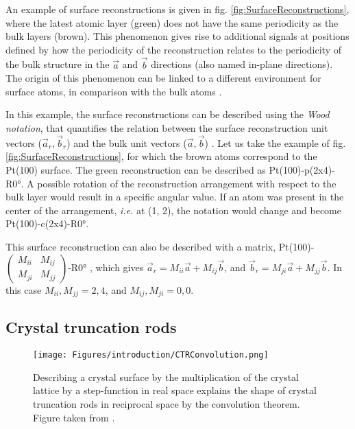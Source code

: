 An example of surface reconstructions is given in fig. \ref{fig:SurfaceReconstructions}, where the latest atomic layer (green) does not have the same periodicity as the bulk layers (brown).
This phenomenon gives rise to additional signals at positions defined by how the periodicity of the reconstruction relates to the periodicity of the bulk structure in the $\vec{a}$ and $\vec{b}$ directions (also named in-plane directions).
The origin of this phenomenon can be linked to a different environment for surface atoms, in comparison with the bulk atoms \parencite{Robinson1983, Feidenhansl1989}.

In this example, the surface reconstructions can be described using the \textit{Wood notation}, that quantifies the relation between the surface reconstruction unit vectors ($\vec{a}_r, \vec{b}_r$) and the bulk unit vectors ($\vec{a}, \vec{b}$) \parencite{Wood1964, Unertl1996, Goncharova2018}.
Let us take the example of fig. \ref{fig:SurfaceReconstructions}, for which the brown atoms correspond to the Pt(100) surface.
The green reconstruction can be described as Pt(100)-p(2x4)-R\ang{0}.
A possible rotation of the reconstruction arrangement with respect to the bulk layer would result in a specific angular value.
If an atom was present in the center of the  arrangement, \textit{i.e.} at (1, 2), the notation would change and become Pt(100)-c(2x4)-R\ang{0}.

This surface reconstruction can also be described with a matrix, Pt(100)-
$\begin{pmatrix}
  M_{ii} & M_{ij}\\
  M_{ji} & M_{jj}
\end{pmatrix}$-R\ang{0}
, which gives $\vec{a}_r = M_{ii} \vec{a} + M_{ij} \vec{b}$, and  $\vec{b}_r = M_{ji} \vec{a} + M_{jj} \vec{b}$.
In this case $M_{ii}, M_{jj} = 2, 4$, and $M_{ij}, M_{ji} = 0, 0$.

\subsection{Crystal truncation rods} \label{sec:CTR}

\begin{figure}[!htb]
    \centering
    \texttt{[image: Figures/introduction/CTRConvolution.png]}
    \caption{
    Describing a crystal surface by the multiplication of the crystal lattice by a step-function in real space explains the shape of crystal truncation rods in reciprocal space by the convolution theorem.
    Figure taken from \cite{Willmott}.
    }
    \label{fig:CTRConvolution}
\end{figure}

